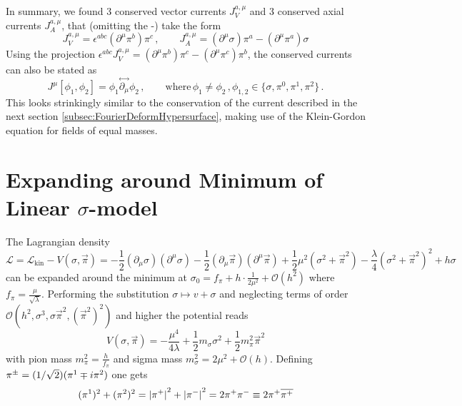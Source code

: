 In summary, we found 3 conserved vector currents $J_V^{a,\mu}$ and 3 conserved axial currents $J_A^{a,\mu}$, that (omitting the -) take the form
\begin{equation}
    J_V^{a,\mu}=\epsilon^{abc}(\partial^\mu\pi^b)\pi^c\,,\qquad J_A^{a,\mu}=(\partial^\mu\sigma)\pi^a-(\partial^\mu\pi^a)\sigma
\end{equation}
Using the projection $\epsilon^{abc}J_V^{a,\mu}=(\partial^\mu\pi^b)\pi^c-(\partial^\mu\pi^c)\pi^b$, the conserved currents can also be stated as
\begin{equation}
    J^\mu[\phi_1,\phi_2]=\phi_1\overset{\leftrightarrow}{\partial_\mu}\phi_2\,,\qquad\text{where}\,\phi_{1}\neq\phi_2\,,\phi_{1,2}\in\{\sigma,\pi^0,\pi^1,\pi^2\}\,.
\end{equation}
This looks strinkingly similar to the conservation of the current described in the next section \eqref{subsec:FourierDeformHypersurface}, making use of the Klein-Gordon equation for fields of equal masses.







\section{Expanding around Minimum of Linear $\sigma$-model}

The Lagrangian density
\begin{equation}
    \mathscr{L}=\mathcal{L}_{\text{kin}}-V(\sigma,\vec{\pi})=-\frac{1}{2}(\partial_\mu\sigma)(\partial^\mu\sigma)-\frac{1}{2}(\partial_\mu\vec{\pi})(\partial^\mu\vec{\pi})+\frac{1}{2}\mu^2(\sigma^2+\vec{\pi}^2)-\frac{\lambda}{4}(\sigma^2+\vec{\pi}^2)^2+h\sigma
    \label{eq:LinearSigmaModelLagrangian}
\end{equation}
can be expanded around the minimum at $\sigma_0=f_\pi+h\cdot\frac{1}{2\mu^2}+\mathcal{O}(h^2)$ where $f_\pi=\frac{\mu}{\sqrt{\lambda}}$. Performing the substitution $\sigma\mapsto v+\sigma$ and neglecting terms of order $\mathcal{O}(h^2,\sigma^3,\sigma\vec{\pi}^2,(\vec{\pi}^2)^2)$ and higher the potential reads
\begin{equation}
    V(\sigma,\vec{\pi})=-\frac{\mu^4}{4\lambda}+\frac{1}{2}m_\sigma\sigma^2+\frac{1}{2}m_\pi^2\vec{\pi}^2
\end{equation}
with pion mass $m_\pi^2=\frac{h}{f_\pi}$ and sigma mass $m_\sigma^2=2\mu^2+\mathcal{O}(h)$. Defining $\pi^\pm=(1/\sqrt{2})(\pi^1\mp{i}\pi^2)$ one gets 
\begin{equation}
    (\pi^1)^2+(\pi^2)^2={\vert\pi^+\vert}^2+{\vert\pi^-\vert}^2=2\pi^+\pi^-\equiv 2\pi^+\overline{\pi^+}
\end{equation}

